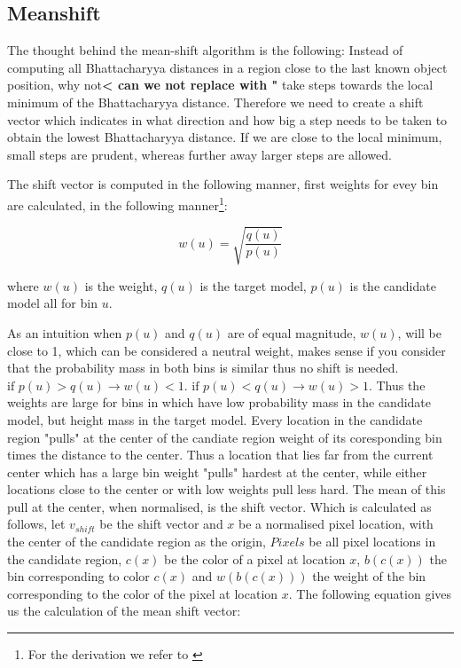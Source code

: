 \documentclass[a4paper,11pt]{article}
\begin{document}
\subsection{Meanshift}

The thought behind the mean-shift algorithm is the following: Instead of computing all Bhattacharyya distances in a region close to the last known object position, why not\textbf{< can we not replace with "} take steps towards the local minimum of the Bhattacharyya distance. Therefore we need to create a shift vector which indicates in what direction and how big a step needs to be taken to obtain the lowest Bhattacharyya distance. If we are close to the local minimum, small steps are prudent, whereas further away larger steps are allowed. 



The shift vector is computed in the following manner, first weights for evey bin are calculated, in the following manner\footnote{For the derivation we refer to \cite{mean_shift}\label{fn:derivation_refer}}:



\begin{equation}
\label{eq:weights}
w(u) = \sqrt{\frac{q(u)}{p(u)}}
\end{equation} %

where $w(u)$ is the weight, $q(u)$ is the target model, $p(u)$ is the candidate model all for bin $u$.



As an intuition when $p(u)$ and $q(u)$ are of equal magnitude, $w(u)$, will be close to 1, which can be considered a neutral weight, makes sense if you consider that the probability mass in both bins is similar thus no shift is needed. $\textrm{if }p(u) > q(u) \rightarrow w(u) < 1$.  $\textrm{if }p(u) < q(u) \rightarrow w(u) > 1$. Thus the weights are large for bins in  which have low probability mass in the candidate model, but height mass in the target model. Every location in the candidate region "pulls" at the center of the candiate region  weight of its coresponding bin times the distance to the center. Thus a location that lies far from the current center which has a large bin weight "pulls" hardest at the center, while either locations close to the center or with low weights pull less hard. The mean of this pull at the center, when normalised, is the shift vector. Which is calculated as follows, let $v_{shift}$ be the shift vector and $x$ be a normalised pixel location, with the center of the candidate region as the origin, $Pixels$ be all pixel locations in the candidate region, $c(x)$ be the color of a pixel at location $x$, $b(c(x))$ the bin corresponding to color $c(x)$ and $w(b(c(x)))$ the weight of the bin corresponding to the color of the pixel at location $x$. The following equation gives us the calculation of the mean shift vector:
\end{document}
